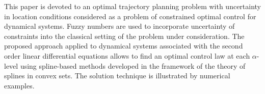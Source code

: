 
This paper is devoted to an optimal trajectory planning problem with uncertainty in location conditions considered as a problem of constrained optimal control for dynamical systems. Fuzzy numbers are used to incorporate uncertainty of constraints into the classical setting of the problem under consideration. The proposed approach applied to dynamical systems associated with the second order linear differential equations allows to find an optimal control law at each $\alpha$-level using spline-based methods developed in the framework of the theory of splines in convex sets. The solution technique is illustrated by numerical examples. 



